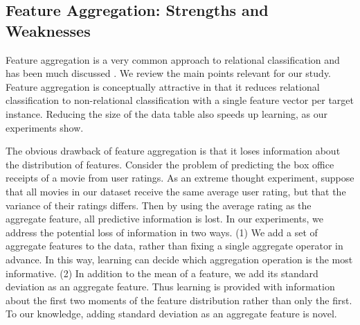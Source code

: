 \documentclass[conference]{IEEEtran}
\begin{document}
\begin{table}[ht]
\caption{Aggregate Functions Used}
\centering
{}
\label{table:functions-used}
\end{table}

\subsection{Feature Aggregation: Strengths and Weaknesses} Feature aggregation is a very common approach to relational classification and has been much discussed \cite{Neville2003,Jensen2003,han2009}. We review the main points relevant for our study. Feature aggregation is conceptually attractive in that it reduces relational classification to non-relational classification with a single feature vector per target instance.  Reducing the size of the data table also speeds up learning, as our experiments show.

The obvious drawback of feature aggregation is that it loses information about the distribution of features. Consider the problem of predicting the box office receipts of a movie from user ratings. As an extreme thought experiment, suppose that all movies in our dataset receive the same average user rating, but that the variance of their ratings differs. Then by using the average rating as the aggregate feature, all predictive information is lost. In our experiments, we address the potential loss of information in two ways. (1) We add a set of aggregate features to the data, rather than fixing a single aggregate operator in advance. In this way, learning can decide which aggregation operation is the most informative. (2) In addition to the mean of a feature, we add its standard deviation as an aggregate feature. Thus learning is provided with information about the first two moments of the feature distribution rather than only the first. To our knowledge, adding standard deviation as an aggregate feature is novel.
\end{document}
